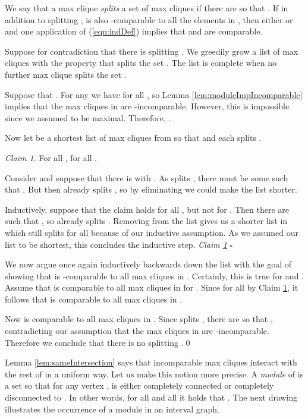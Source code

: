 \documentclass[10pt]{article}
\theoremstyle{remark}
\newtheorem{claim}[thm]{Claim}
\theoremstyle{definition}
\theoremstyle{plain}
\newcommand{\qedd}[1]{\hfill {\scriptsize\it #1} \ensuremath{\square}}
\begin{document}
\proof We say that a max clique  \emph{splits} a set of max cliques  if there are  so that . If in addition to splitting ,  is also -comparable to all the elements in , then either  or  and one application of (\ref{eqn:indDef}) implies that  and  are comparable.

Suppose for contradiction that there is  splitting .
We greedily grow a list of max cliques  with the property that  splits the set .
The list  is complete when no further max clique splits the set .

Suppose that . For any  we have  for all , so Lemma \ref{lem:moduleImpIncomparable} implies that the max cliques in  are -incomparable. However, this is impossible since we assumed  to be maximal. Therefore, .


Now let  be a shortest list of max cliques from  so that  and each  splits .

\begin{claim}\label{claim:auxLemSameIntersection}
For all ,  for all .
\end{claim}
 Consider  and suppose that there is  with . As  splits , there must be some  such that . But then  already splits , so by eliminating  we could make the list shorter.

Inductively, suppose that the claim holds for all , but not for . Then there are  such that , so  already splits . Removing  from the list gives us a shorter list in which  still splits  for all  because of our inductive assumption. As we assumed our list to be shortest, this concludes the inductive step. \qedd{Claim \ref{claim:auxLemSameIntersection}}




We now argue once again inductively backwards down the list  with the goal of showing that  is -comparable to all max cliques in . Certainly, this is true for  and . Assume that  is comparable to all max cliques in  for . Since  for all  by Claim \ref{claim:auxLemSameIntersection}, it follows that  is comparable to all max cliques in .

Now  is comparable to all max cliques in . Since  splits , there are  so that , contradicting our assumption that the max cliques in  are -incomparable. Therefore we conclude that there is no  splitting .\qed



Lemma \ref{lem:sameIntersection} says that incomparable max cliques interact with the rest of  in a uniform way. Let us make this notion more precise. A \emph{module} of  is a set  so that for any vertex ,  is either completely connected or completely disconnected to . In other words, for all  and all  it holds that . The next drawing illustrates the occurrence of a module in an interval graph.
\end{document}
